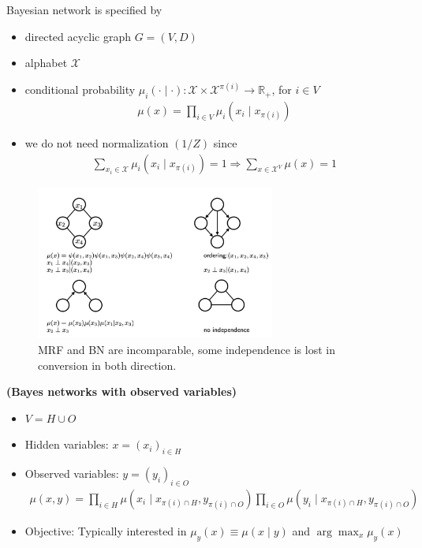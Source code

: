 \documentclass{article}
\newcommand{\bfs}[1]{\textbf{({#1}) }}
\begin{document}
Bayesian network is specified by
\begin{itemize}
    \item directed acyclic graph $G=(V, D)$
    \item alphabet $\mathcal{X}$
    \item conditional probability $\mu_{i}(\cdot \mid \cdot): \mathcal{X} \times \mathcal{X}^{\pi(i)} \rightarrow \mathbb{R}_{+}$, for $i \in V$
\begin{align*}
\mu(x)=\prod_{i \in V} \mu_{i}\left(x_{i} \mid x_{\pi(i)}\right)
\end{align*}
\item we do not need normalization $(1 / Z)$ since
\begin{align*}
\sum_{x_{i} \in \mathcal{X}} \mu_{i}\left(x_{i} \mid x_{\pi(i)}\right)=1 \Rightarrow \sum_{x \in \mathcal{X}^{V}} \mu(x)=1
\end{align*}
\end{itemize}

\begin{figure}[H]
    \centering
    \includegraphics[width=0.7\textwidth]{Figs/5.png}
    \caption{MRF and BN are incomparable, some independence  is lost in conversion in both direction.}
    \label{fig:bayesvsmrf}
\end{figure}
\begin{exma}\bfs{Bayes networks with observed variables}
\begin{itemize}
    \item $V=H \cup O$
    \item  Hidden variables: $x=\left(x_{i}\right)_{i \in H}$
    \item Observed variables: $y=\left(y_{i}\right)_{i \in O}$
\begin{align*}
\mu(x, y)=\prod_{i \in H} \mu\left(x_{i} \mid x_{\pi(i) \cap H}, y_{\pi(i) \cap O}\right) \prod_{i \in O} \mu\left(y_{i} \mid x_{\pi(i) \cap H}, y_{\pi(i) \cap O}\right)
\end{align*}
\item Objective: 
Typically interested in $\mu_{y}(x) \equiv \mu(x \mid y)$ and
$\arg \max _{x} \mu_{y}(x)$
\end{itemize}
\end{exma}
\end{document}
